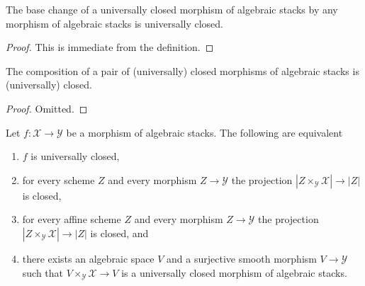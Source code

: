 \begin{lemma}
\label{lemma-base-change-universally-closed}
The base change of a universally closed morphism of algebraic stacks
by any morphism of algebraic stacks is universally closed.
\end{lemma}

\begin{proof}
This is immediate from the definition.
\end{proof}

\begin{lemma}
\label{lemma-composition-universally-closed}
The composition of a pair of (universally) closed morphisms of
algebraic stacks is (universally) closed.
\end{lemma}

\begin{proof}
Omitted.
\end{proof}

\begin{lemma}
\label{lemma-universally-closed-local}
Let $f : \mathcal{X} \to \mathcal{Y}$ be a morphism of algebraic stacks.
The following are equivalent
\begin{enumerate}
\item $f$ is universally closed,
\item for every scheme $Z$ and every morphism $Z \to \mathcal{Y}$
the projection $|Z \times_\mathcal{Y} \mathcal{X}| \to |Z|$
is closed,
\item for every affine scheme $Z$ and every morphism $Z \to \mathcal{Y}$
the projection $|Z \times_\mathcal{Y} \mathcal{X}| \to |Z|$ is
closed, and
\item there exists an algebraic space $V$ and a surjective smooth morphism
$V \to \mathcal{Y}$ such that $V \times_\mathcal{Y} \mathcal{X} \to V$
is a universally closed morphism of algebraic stacks.
\end{enumerate}
\end{lemma}

